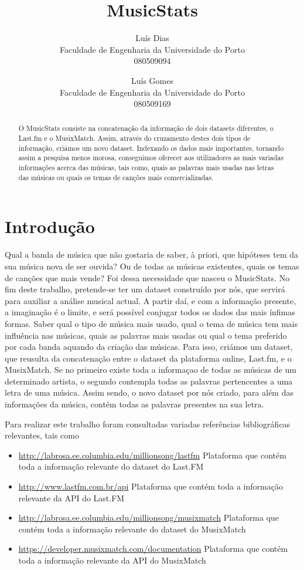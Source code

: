 \documentclass[twocolumn,twoside,10pt,a4paper]{article}
\title{MusicStats}
\author{Luís Dias\\Faculdade de Engenharia da Universidade do Porto\\080509094
\and
Luís Gomes\\Faculdade de Engenharia da Universidade do Porto\\080509169
}
\begin{document}
\maketitle

\begin{abstract}
O MusicStats consiste na concatenação da informação de dois datasets diferentes, o Last.fm e o MusixMatch.
Assim, através do cruzamento destes dois tipos de informação, criámos um novo dataset. Indexando os dados mais importantes, tornando assim a pesquisa menos morosa, conseguimos oferecer aos utilizadores as mais variadas informações acerca das músicas, tais como, quais as palavras mais usadas nas letras das músicas ou quais os temas de canções mais comercializadas.
\end{abstract}

\section{Introdução}

Qual a banda de música que não gostaria de saber, à priori, que hipóteses tem da sua música nova de ser ouvida? Ou de todas as músicas existentes, quais os temas de canções que mais vende? Foi dessa necessidade que nasceu o MusicStats. No fim deste trabalho, pretende-se ter um dataset construído por nós, que servirá para auxiliar a análise musical actual. A partir daí, e com a informação presente, a imaginação é o limite, e será possível conjugar todos os dados das mais ínfimas formas. Saber qual o tipo de música mais usado, qual o tema de música tem mais influência nas músicas, quais as palavras mais usadas ou qual o tema preferido por cada banda aquando da criação das músicas. Para isso, criámos um dataset, que reusulta da concatenação entre o dataset da plataforma online, Last.fm, e o MusixMatch. Se no primeiro existe toda a informaçao de todas as músicas de um determinado artista, o segundo contempla todas as palavras pertencentes a uma letra de uma música. Assim sendo, o novo dataset por nós criado, para além das informações da música, contém todas as palavras presentes na sua letra.

Para realizar este trabalho foram consultadas variadas referências
bibliográficas relevantes, tais como
\begin{itemize}
\item \url{http://labrosa.ee.columbia.edu/millionsong/lastfm} Plataforma que contém toda a informação relevante do dataset do Last.FM
\item \url{http://www.lastfm.com.br/api} Plataforma que contém toda a informação relevante da API do Last.FM
\item \url{http://labrosa.ee.columbia.edu/millionsong/musixmatch} Plataforma que contém toda a informação relevante do dataset do MusixMatch
\item \url{https://developer.musixmatch.com/documentation} Plataforma que contém toda a informação relevante da API do MusixMatch
\end{itemize}
\end{document}
